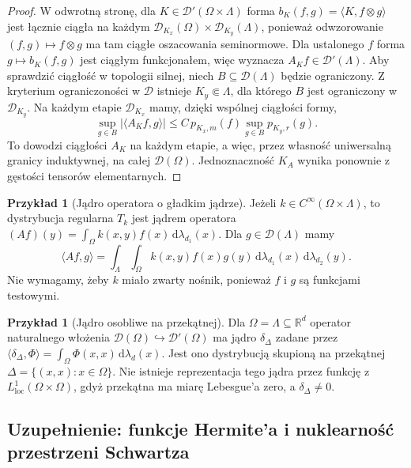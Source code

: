 \documentclass[11pt,a4paper]{article}
\numberwithin{equation}{section}
\theoremstyle{plain}
\theoremstyle{definition}
\newtheorem{przyklad}[twierdzenie]{Przykład}
\theoremstyle{remark}
\newcommand{\R}{\mathbb R}
\begin{document}
\begin{proof}
W odwrotną stronę, dla $K\in\mathcal D'(\Omega\times\Lambda)$
forma $b_K(f,g)=\langle K,f\otimes g\rangle$ jest
łącznie ciągła na każdym
$\mathcal D_{K_x}(\Omega)\times\mathcal D_{K_y}(\Lambda)$,
ponieważ odwzorowanie $(f,g)\mapsto f\otimes g$
ma tam ciągłe oszacowania seminormowe.
Dla ustalonego $f$ forma $g\mapsto b_K(f,g)$
jest ciągłym funkcjonałem, więc wyznacza $A_Kf\in\mathcal D'(\Lambda)$.
Aby sprawdzić ciągłość w topologii silnej, niech
$B\subseteq\mathcal D(\Lambda)$ będzie ograniczony.
Z kryterium ograniczoności w $\mathcal D$ istnieje
$K_y\Subset\Lambda$, dla którego $B$ jest ograniczony
w $\mathcal D_{K_y}$. Na każdym etapie $\mathcal D_{K_x}$
mamy, dzięki wspólnej ciągłości formy,
\[
 \sup_{g\in B}|\langle A_Kf,g\rangle|
 \le C\,p_{K_x,m}(f)\sup_{g\in B}p_{K_y,r}(g).
\]
To dowodzi ciągłości $A_K$ na każdym etapie, a więc,
przez własność uniwersalną granicy induktywnej,
na całej $\mathcal D(\Omega)$. Jednoznaczność $K_A$
wynika ponownie z gęstości tensorów elementarnych.
\end{proof}

\begin{przyklad}[Jądro operatora o gładkim jądrze]
\label{ex:smooth-kernel23}
Jeżeli $k\in C^\infty(\Omega\times\Lambda)$, to dystrybucja
regularna $T_k$ jest jądrem operatora
$(Af)(y)=\int_\Omega k(x,y)f(x)\,\mathrm d\lambda_{d_1}(x)$.
Dla $g\in\mathcal D(\Lambda)$ mamy
\[
\langle Af,g\rangle
=\int_{\Lambda}\int_{\Omega}k(x,y)f(x)g(y)
\,\mathrm d\lambda_{d_1}(x)\,\mathrm d\lambda_{d_2}(y).
\]
Nie wymagamy, żeby $k$ miało zwarty nośnik, ponieważ
$f$ i $g$ są funkcjami testowymi.
\end{przyklad}

\begin{przyklad}[Jądro osobliwe na przekątnej]
\label{ex:diagonal-kernel23}
Dla $\Omega=\Lambda\subseteq\R^d$ operator naturalnego
włożenia $\mathcal D(\Omega)\hookrightarrow\mathcal D'(\Omega)$
ma jądro $\delta_\Delta$ zadane przez
$\langle\delta_\Delta,\Phi\rangle
=\int_\Omega\Phi(x,x)\,\mathrm d\lambda_d(x)$.
Jest ono dystrybucją skupioną na przekątnej
$\Delta=\{(x,x):x\in\Omega\}$. Nie istnieje
reprezentacja tego jądra przez funkcję z
$L^1_{\mathrm{loc}}(\Omega\times\Omega)$,
gdyż przekątna ma miarę Lebesgue'a zero, a
$\delta_\Delta\ne0$.
\end{przyklad}

\subsection{Uzupełnienie: funkcje Hermite'a i nuklearność przestrzeni Schwartza}
\label{sec:hermite-supp23}
\end{document}
